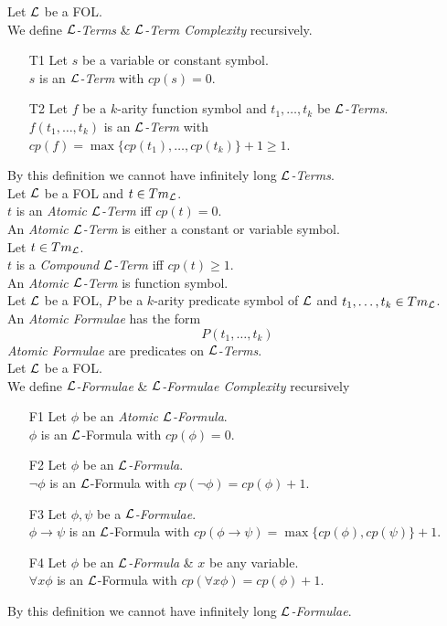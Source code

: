 \documentclass[11pt,a4paper]{article}
\begin{document}
Let $\mathcal{L}$ be a FOL.\\
We define \textit{$\mathcal{L}$-Terms} \& \textit{$\mathcal{L}$-Term Complexity} recursively.
\begin{itemize}
	\item[T1] Let $s$ be a variable or constant symbol.\\
	$s$ is an \textit{$\mathcal{L}$-Term} with $cp(s)=0$.
	\item[T2] Let $f$ be a $k$-arity function symbol and $t_1,\dots,t_k$ be \textit{$\mathcal{L}$-Terms}.\\
	$f(t_1,\dots,t_k)$ is an \textit{$\mathcal{L}$-Term} with $cp(f)=\max\{cp(t_1),\dots,cp(t_k)\}+1\geq1$.
\end{itemize}
\nb By this definition we cannot have infinitely long \textit{$\mathcal{L}$-Terms}.\\

Let $\mathcal{L}$ be a FOL and $t\in Tm_{\mathcal{L}}$.\\
$t$ is an \textit{Atomic $\mathcal{L}$-Term} iff $cp(t)=0$.\\
\ie An \textit{Atomic $\mathcal{L}$-Term} is either a constant or variable symbol.\\

Let $t\in Tm_{\mathcal{L}}$.\\
$t$ is a \textit{Compound $\mathcal{L}$-Term} iff $cp(t)\geq1$.\\
\ie An \textit{Atomic $\mathcal{L}$-Term} is function symbol.\\

Let $\mathcal{L}$ be a FOL, $P$ be a $k$-arity predicate symbol of $\mathcal{L}$ and $t_1,\dots,t_k\in Tm_{\mathcal{L}}$.\\
An \textit{Atomic Formulae} has the form
$$P(t_1,\dots,t_k)$$
\ie \textit{Atomic Formulae} are predicates on \textit{$\mathcal{L}$-Terms}.\\

Let $\mathcal{L}$ be a FOL.\\
We define \textit{$\mathcal{L}$-Formulae} \& \textit{$\mathcal{L}$-Formulae Complexity} recursively
\begin{itemize}
	\item[F1] Let $\phi$ be an \textit{Atomic $\mathcal{L}$-Formula}.\\
	$\phi$ is an $\mathcal{L}$-Formula with $cp(\phi)=0$.
	\item[F2] Let $\phi$ be an \textit{$\mathcal{L}$-Formula}.\\
	$\neg\phi$ is an $\mathcal{L}$-Formula with $cp(\neg\phi)=cp(\phi)+1$.
	\item[F3] Let $\phi,\psi$ be a \textit{$\mathcal{L}$-Formulae}.\\
	$\phi\to\psi$ is an $\mathcal{L}$-Formula with $cp(\phi\to\psi)=\max\{cp(\phi),cp(\psi)\}+1$.
	\item[F4] Let $\phi$ be an \textit{$\mathcal{L}$-Formula} \& $x$ be any variable.\\
	$\forall x\phi$ is an $\mathcal{L}$-Formula with $cp(\forall x\phi)=cp(\phi)+1$.
\end{itemize}
\nb By this definition we cannot have infinitely long \textit{$\mathcal{L}$-Formulae}.\\
\end{document}
